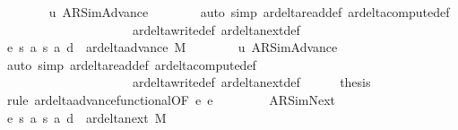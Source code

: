 \begin{isabellebody}
\ \ \ \ \ \ \isamarkupfalse%
\ u{}\ AR{\isacharunderscore}{\kern0pt}SimAdvance\isanewline
\ \ \ \ \ \ \isamarkupfalse%
\ {\isacharparenleft}{\kern0pt}auto\ simp{\isacharcolon}{\kern0pt}\ ar{\isacharunderscore}{\kern0pt}delta{\isacharunderscore}{\kern0pt}read{\isacharunderscore}{\kern0pt}def\ ar{\isacharunderscore}{\kern0pt}delta{\isacharunderscore}{\kern0pt}compute{\isacharunderscore}{\kern0pt}def\isanewline
\ \ \ \ \ \ \ \ \ \ \ \ \ \ \ \ \ \ \ \ \ ar{\isacharunderscore}{\kern0pt}delta{\isacharunderscore}{\kern0pt}write{\isacharunderscore}{\kern0pt}def\ ar{\isacharunderscore}{\kern0pt}delta{\isacharunderscore}{\kern0pt}next{\isacharunderscore}{\kern0pt}def{\isacharparenright}{\kern0pt}\isanewline
\ \ \ \ \isamarkupfalse%
\ e{}{\isacharcolon}{\kern0pt}\ {\isachardoublequoteopen}{\isacharparenleft}{\kern0pt}s{\isacharcomma}{\kern0pt}\ a{\isacharcomma}{\kern0pt}\ s{}{\isacharcomma}{\kern0pt}\ a{}{\isacharcomma}{\kern0pt}\ d{}{\isacharparenright}{\kern0pt}\ {\isasymin}\ ar{\isacharunderscore}{\kern0pt}delta{\isacharunderscore}{\kern0pt}advance\ M{\isachardoublequoteclose}\isanewline
\ \ \ \ \ \ \isamarkupfalse%
\ u{}\ AR{\isacharunderscore}{\kern0pt}SimAdvance\isanewline
\ \ \ \ \ \ \isamarkupfalse%
\ {\isacharparenleft}{\kern0pt}auto\ simp{\isacharcolon}{\kern0pt}\ ar{\isacharunderscore}{\kern0pt}delta{\isacharunderscore}{\kern0pt}read{\isacharunderscore}{\kern0pt}def\ ar{\isacharunderscore}{\kern0pt}delta{\isacharunderscore}{\kern0pt}compute{\isacharunderscore}{\kern0pt}def\isanewline
\ \ \ \ \ \ \ \ \ \ \ \ \ \ \ \ \ \ \ \ \ ar{\isacharunderscore}{\kern0pt}delta{\isacharunderscore}{\kern0pt}write{\isacharunderscore}{\kern0pt}def\ ar{\isacharunderscore}{\kern0pt}delta{\isacharunderscore}{\kern0pt}next{\isacharunderscore}{\kern0pt}def{\isacharparenright}{\kern0pt}\isanewline
\ \ \ \ \isamarkupfalse%
\ {\isacharquery}{\kern0pt}thesis\ \isamarkupfalse%
\ {\isacharparenleft}{\kern0pt}rule\ ar{\isacharunderscore}{\kern0pt}delta{\isacharunderscore}{\kern0pt}advance{\isacharunderscore}{\kern0pt}functional{\isacharbrackleft}{\kern0pt}OF\ e{}\ e{}{\isacharbrackright}{\kern0pt}{\isacharparenright}{\kern0pt}\isanewline
\ \ \isamarkupfalse%
\isanewline
\ \ \ \ \isamarkupfalse%
\ AR{\isacharunderscore}{\kern0pt}SimNext\isanewline
\ \ \ \ \isamarkupfalse%
\ e{}{\isacharcolon}{\kern0pt}\ {\isachardoublequoteopen}{\isacharparenleft}{\kern0pt}s{\isacharcomma}{\kern0pt}\ a{\isacharcomma}{\kern0pt}\ s{}{\isacharcomma}{\kern0pt}\ a{}{\isacharcomma}{\kern0pt}\ d{}{\isacharparenright}{\kern0pt}\ {\isasymin}\ ar{\isacharunderscore}{\kern0pt}delta{\isacharunderscore}{\kern0pt}next\ M{\isachardoublequoteclose}\isanewline

\end{isabellebody}
